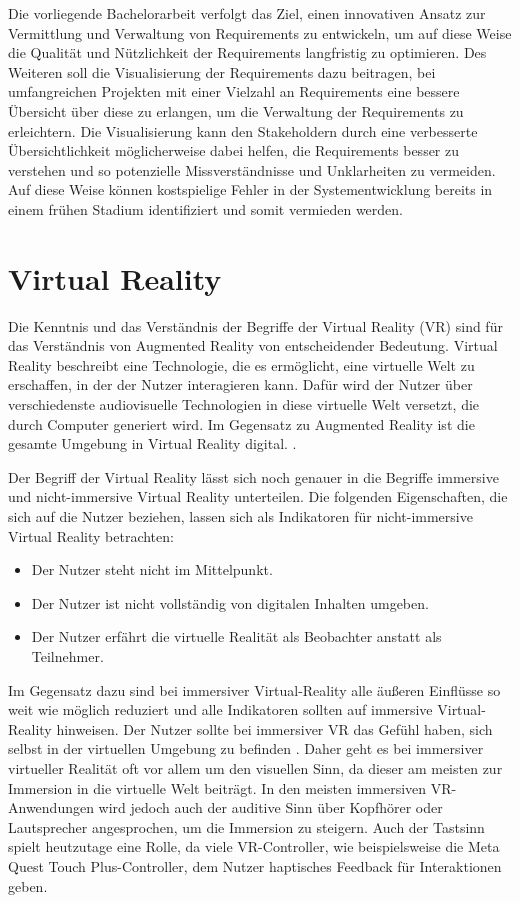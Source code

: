     Die vorliegende Bachelorarbeit verfolgt das Ziel, einen innovativen Ansatz zur Vermittlung und Verwaltung von Requirements zu entwickeln, um auf diese Weise die Qualität und Nützlichkeit der Requirements langfristig zu optimieren.
    Des Weiteren soll die Visualisierung der Requirements dazu beitragen, bei umfangreichen Projekten mit einer Vielzahl an Requirements eine bessere Übersicht über diese zu erlangen, um die Verwaltung der Requirements zu erleichtern.
    Die Visualisierung kann den Stakeholdern durch eine verbesserte Übersichtlichkeit möglicherweise dabei helfen, die Requirements besser zu verstehen und so potenzielle Missverständnisse und Unklarheiten zu vermeiden.
    Auf diese Weise können kostspielige Fehler in der Systementwicklung bereits in einem frühen Stadium identifiziert und somit vermieden werden.
    


  \section{Virtual Reality}
  Die Kenntnis und das Verständnis der Begriffe der Virtual Reality (VR) sind für das Verständnis von Augmented Reality von entscheidender Bedeutung.
  Virtual Reality beschreibt eine Technologie, die es ermöglicht, eine virtuelle Welt zu erschaffen, in der der Nutzer interagieren kann.
  Dafür wird der Nutzer über verschiedenste audiovisuelle Technologien in diese virtuelle Welt versetzt, die durch Computer generiert wird.
  Im Gegensatz zu Augmented Reality ist die gesamte Umgebung in Virtual Reality digital. \autocite[vgl.][S.15]{Dalton2023}.

  Der Begriff der Virtual Reality lässt sich noch genauer in die Begriffe immersive und nicht-immersive Virtual Reality unterteilen.
  Die folgenden Eigenschaften, die sich auf die Nutzer beziehen, lassen sich als Indikatoren für nicht-immersive Virtual Reality betrachten:
  \begin{itemize}
    \item Der Nutzer steht nicht im Mittelpunkt.
    \item Der Nutzer ist nicht vollständig von digitalen Inhalten umgeben.
    \item Der Nutzer erfährt die virtuelle Realität als Beobachter anstatt als Teilnehmer.
  \end{itemize}
  Im Gegensatz dazu sind bei immersiver Virtual-Reality alle äußeren Einflüsse so weit wie möglich reduziert und alle Indikatoren sollten auf immersive Virtual-Reality hinweisen.
  Der Nutzer sollte bei immersiver VR das Gefühl haben, sich selbst in der virtuellen Umgebung zu befinden \autocite[vgl.][S.23-24]{Wolfel2023}.
  Daher geht es bei immersiver virtueller Realität oft vor allem um den visuellen Sinn, da dieser am meisten zur Immersion in die virtuelle Welt beiträgt.
  In den meisten immersiven VR-Anwendungen wird jedoch auch der auditive Sinn über Kopfhörer oder Lautsprecher angesprochen, um die Immersion zu steigern.
  Auch der Tastsinn spielt heutzutage eine Rolle, da viele VR-Controller, wie beispielsweise die Meta Quest Touch Plus-Controller, dem Nutzer haptisches Feedback für Interaktionen geben.


